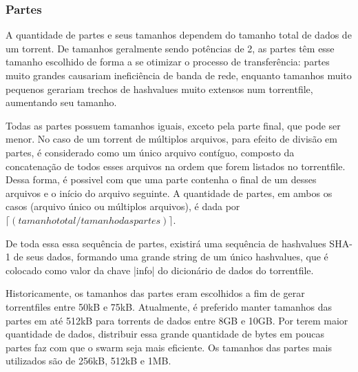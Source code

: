 \subsubsection*{Partes}
\label{subsec:partes}

A quantidade de partes e seus tamanhos dependem do tamanho total de dados de um
\gls*{torrent}. De tamanhos geralmente sendo potências de 2, as partes têm esse tamanho
escolhido de forma a se otimizar o processo de transferência: partes muito grandes
causariam ineficiência de banda de rede, enquanto tamanhos muito pequenos gerariam
trechos de \glspl*{hashvalue} muito extensos num \gls*{torrentfile}, aumentando seu
tamanho.

Todas as partes possuem tamanhos iguais, exceto pela parte final, que pode ser menor.
No caso de um \gls*{torrent} de múltiplos arquivos, para efeito de divisão em partes, é
considerado como um único arquivo contíguo, composto da concatenação de todos esses
arquivos na ordem que forem listados no \gls*{torrentfile}. Dessa forma, é possivel com
que uma parte contenha o final de um desses arquivos e o início do arquivo seguinte. A
quantidade de partes, em ambos os casos (arquivo único ou múltiplos arquivos), é dada
por $\lceil (tamanho total / tamanho das partes) \rceil$.

De toda essa essa sequência de partes, existirá uma sequência de \glspl*{hashvalue}
SHA-1 de seus dados, formando uma grande \gls*{string} de um único \glspl*{hashvalue},
que é colocado como valor da chave \bverb|info| do dicionário de dados do
\gls*{torrentfile}.

Historicamente, os tamanhos das partes eram escolhidos a fim de gerar
\glspl*{torrentfile} entre 50kB e 75kB. Atualmente, é preferido manter tamanhos das
partes em até 512kB para \glspl*{torrent} de dados entre 8GB e 10GB. Por terem maior
quantidade de dados, distribuir essa grande quantidade de bytes em poucas partes faz com
que o \gls*{swarm} seja mais eficiente. Os tamanhos das partes mais utilizados são de
256kB, 512kB e 1MB.